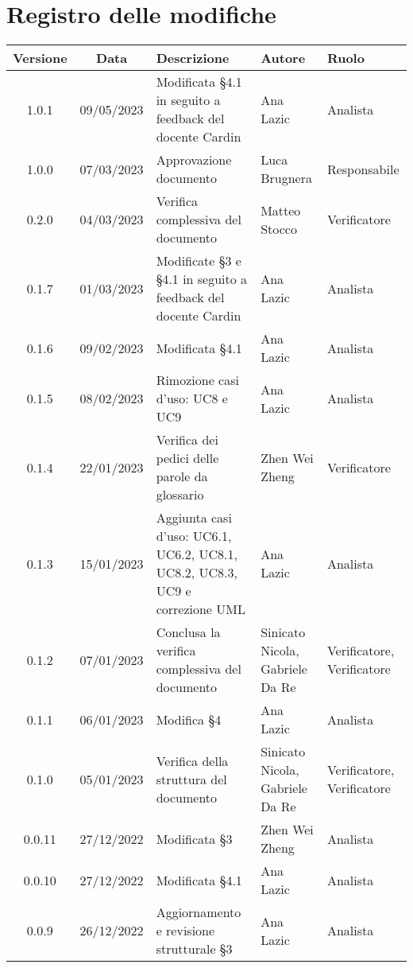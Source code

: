 \section*{Registro delle modifiche}
\begin{center}
\setlength\extrarowheight{5pt}
\renewcommand\tabularxcolumn[1]{>{\Centering}m{#1}}
\begin{tabularx}{\textwidth}{| c | c | X | X | X |} 
	\hline
	\rowcolor{white}
	\textbf{Versione} & \textbf{Data} & \textbf{Descrizione} & \textbf{Autore} & \textbf{Ruolo}\\
    \hline
	1.0.1 & 09/05/2023 & Modificata §4.1 in seguito a feedback del docente Cardin  & Ana Lazic & Analista\\
	\hline
	1.0.0 & 07/03/2023 & Approvazione documento & Luca Brugnera & Responsabile\\
	\hline
	0.2.0 & 04/03/2023 & Verifica complessiva del documento & Matteo Stocco & Verificatore \\
 	\hline
	0.1.7 & 01/03/2023 & Modificate §3 e §4.1 in seguito a feedback del docente Cardin & Ana Lazic & Analista \\
	\hline
	0.1.6 & 09/02/2023 & Modificata §4.1 & Ana Lazic & Analista \\
 	\hline
	0.1.5 & 08/02/2023 & Rimozione casi d'uso: UC8 e UC9 & Ana Lazic & Analista \\
	\hline
	0.1.4 & 22/01/2023 & Verifica dei pedici delle parole da glossario & Zhen Wei Zheng & Verificatore \\
    	\hline
   	 0.1.3 & 15/01/2023 & Aggiunta casi d'uso: UC6.1, UC6.2, UC8.1, UC8.2, UC8.3, UC9 e correzione UML & Ana Lazic & Analista \\
	\hline
	0.1.2 & 07/01/2023 & Conclusa la verifica complessiva del documento & Sinicato Nicola, Gabriele Da Re & Verificatore, Verificatore \\
	\hline
	0.1.1 & 06/01/2023 & Modifica §4 & Ana Lazic & Analista \\
	\hline
	0.1.0 & 05/01/2023 & Verifica della struttura del documento & Sinicato Nicola, Gabriele Da Re & Verificatore, Verificatore\\
	\hline
	0.0.11 & 27/12/2022 & Modificata §3 & Zhen Wei Zheng & Analista\\
    	\hline
	0.0.10 & 27/12/2022 & Modificata §4.1 & Ana Lazic & Analista\\
   	\hline
	0.0.9 & 26/12/2022 & Aggiornamento e revisione strutturale §3 & Ana Lazic & Analista\\

\end{tabularx}
\end{center}
